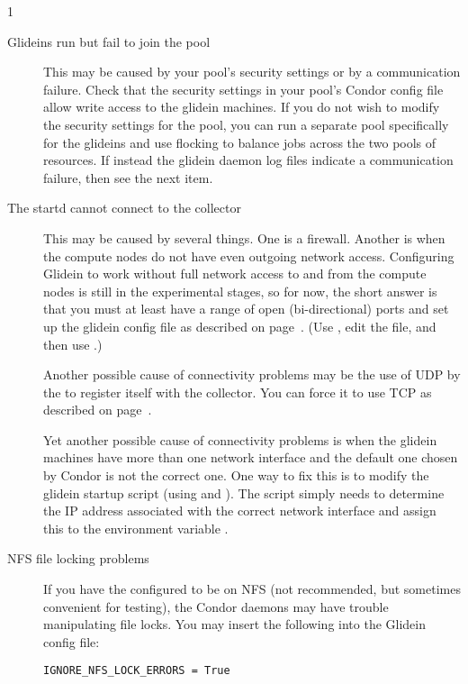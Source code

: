 \begin{ManPage}{\label{man-condor-glidein}}{1}
\begin{description}
\item[Glideins run but fail to join the pool] This may be caused by
your pool's security settings or by a communication failure.  Check
that the security settings in your pool's Condor config file allow
write access to the glidein machines.  If you do not wish to modify
the security settings for the pool, you can run a separate pool
specifically for the glideins and use flocking to balance jobs across
the two pools of resources.  If instead the glidein daemon log files
indicate a communication failure, then see the next item.

\item[The startd cannot connect to the collector] This may be caused
by several things.  One is a firewall.  Another is when the compute
nodes do not have even outgoing network access.  Configuring Glidein
to work without full network access to and from the compute nodes is
still in the experimental stages, so for now, the short answer is that
you must at least have a range of open (bi-directional) ports and set
up the glidein config file as described on
page~\pageref{param:HighPort}.  (Use , edit the file,
and then use .)

Another possible cause of connectivity problems may be the use of UDP by
the  to register itself with the collector.  You can
force it to use TCP as described on
page~\pageref{param:UpdateCollectorWithTcp}.

Yet another possible cause of connectivity problems is when the glidein
machines have more than one network interface and the default one chosen
by Condor is not the correct one.  One way to fix this is to modify
the glidein startup script (using  and ).
The script simply needs to determine the IP address associated with
the correct network interface and assign this to the environment
variable .

\item[NFS file locking problems]  If you have the 
configured to be on NFS (not recommended, but sometimes convenient
for testing), the Condor daemons may have trouble manipulating file
locks.  You may insert the following into the Glidein config file:

\begin{verbatim}
IGNORE_NFS_LOCK_ERRORS = True
\end{verbatim}

\end{description}

\end{ManPage}
